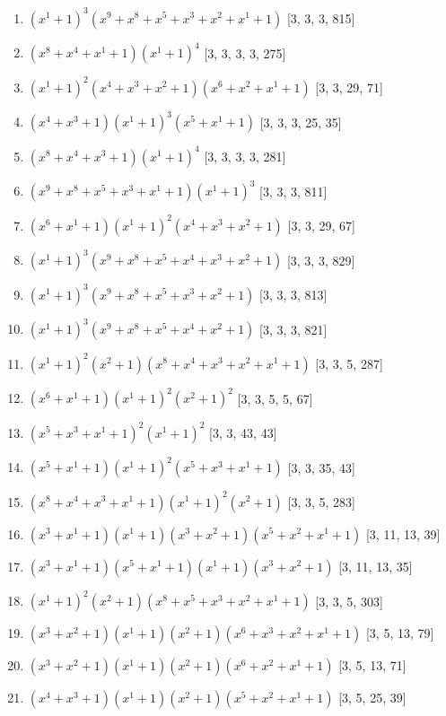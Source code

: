 \documentclass[10pt,twocolumn]{article}
\begin{document}
\begin{enumerate}
\item $(x^{1} + 1)^{3}(x^{9} + x^{8} + x^{5} + x^{3} + x^{2} + x^{1} + 1)$  [3, 3, 3, 815]
\item $(x^{8} + x^{4} + x^{1} + 1)(x^{1} + 1)^{4}$  [3, 3, 3, 3, 275]
\item $(x^{1} + 1)^{2}(x^{4} + x^{3} + x^{2} + 1)(x^{6} + x^{2} + x^{1} + 1)$  [3, 3, 29, 71]
\item $(x^{4} + x^{3} + 1)(x^{1} + 1)^{3}(x^{5} + x^{1} + 1)$  [3, 3, 3, 25, 35]
\item $(x^{8} + x^{4} + x^{3} + 1)(x^{1} + 1)^{4}$  [3, 3, 3, 3, 281]
\item $(x^{9} + x^{8} + x^{5} + x^{3} + x^{1} + 1)(x^{1} + 1)^{3}$  [3, 3, 3, 811]
\item $(x^{6} + x^{1} + 1)(x^{1} + 1)^{2}(x^{4} + x^{3} + x^{2} + 1)$  [3, 3, 29, 67]
\item $(x^{1} + 1)^{3}(x^{9} + x^{8} + x^{5} + x^{4} + x^{3} + x^{2} + 1)$  [3, 3, 3, 829]
\item $(x^{1} + 1)^{3}(x^{9} + x^{8} + x^{5} + x^{3} + x^{2} + 1)$  [3, 3, 3, 813]
\item $(x^{1} + 1)^{3}(x^{9} + x^{8} + x^{5} + x^{4} + x^{2} + 1)$  [3, 3, 3, 821]
\item $(x^{1} + 1)^{2}(x^{2} + 1)(x^{8} + x^{4} + x^{3} + x^{2} + x^{1} + 1)$  [3, 3, 5, 287]
\item $(x^{6} + x^{1} + 1)(x^{1} + 1)^{2}(x^{2} + 1)^{2}$  [3, 3, 5, 5, 67]
\item $(x^{5} + x^{3} + x^{1} + 1)^{2}(x^{1} + 1)^{2}$  [3, 3, 43, 43]
\item $(x^{5} + x^{1} + 1)(x^{1} + 1)^{2}(x^{5} + x^{3} + x^{1} + 1)$  [3, 3, 35, 43]
\item $(x^{8} + x^{4} + x^{3} + x^{1} + 1)(x^{1} + 1)^{2}(x^{2} + 1)$  [3, 3, 5, 283]
\item $(x^{3} + x^{1} + 1)(x^{1} + 1)(x^{3} + x^{2} + 1)(x^{5} + x^{2} + x^{1} + 1)$  [3, 11, 13, 39]
\item $(x^{3} + x^{1} + 1)(x^{5} + x^{1} + 1)(x^{1} + 1)(x^{3} + x^{2} + 1)$  [3, 11, 13, 35]
\item $(x^{1} + 1)^{2}(x^{2} + 1)(x^{8} + x^{5} + x^{3} + x^{2} + x^{1} + 1)$  [3, 3, 5, 303]
\item $(x^{3} + x^{2} + 1)(x^{1} + 1)(x^{2} + 1)(x^{6} + x^{3} + x^{2} + x^{1} + 1)$  [3, 5, 13, 79]
\item $(x^{3} + x^{2} + 1)(x^{1} + 1)(x^{2} + 1)(x^{6} + x^{2} + x^{1} + 1)$  [3, 5, 13, 71]
\item $(x^{4} + x^{3} + 1)(x^{1} + 1)(x^{2} + 1)(x^{5} + x^{2} + x^{1} + 1)$  [3, 5, 25, 39]

\end{enumerate}
\end{document}
